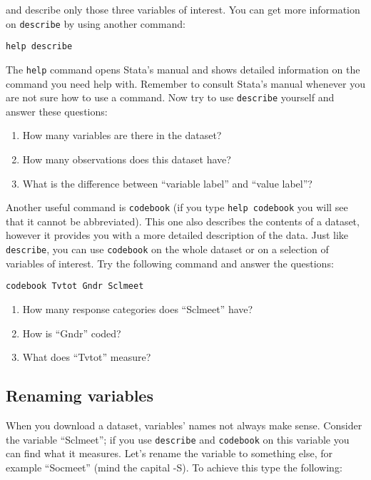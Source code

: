 \documentclass{article}
\begin{document}
and describe only those three variables of interest. You can get more information on \texttt{describe} by using another command:

\begin{lstlisting}
help describe
\end{lstlisting}

The \texttt{help} command opens Stata's manual and shows detailed information on the command you need help with. Remember to consult Stata's manual whenever you are not sure how to use a command. Now try to use \texttt{describe} yourself and answer these questions:

\begin{enumerate}
	\item How many variables are there in the dataset?
	\item How many observations does this dataset have?
	\item What is the difference between ``variable label'' and ``value label''?
\end{enumerate}

Another useful command is \texttt{codebook} (if you type \texttt{help codebook} you will see that it cannot be abbreviated). This one also describes the contents of a dataset, however it provides you with a more detailed description of the data. Just like \texttt{describe}, you can use \texttt{codebook} on the whole dataset or on a selection of variables of interest. Try the following command and answer the questions:

\begin{lstlisting}
codebook Tvtot Gndr Sclmeet
\end{lstlisting}

\begin{enumerate}
	\item How many response categories does ``Sclmeet'' have?
	\item How is ``Gndr'' coded?
	\item What does ``Tvtot'' measure?
\end{enumerate}

\subsection*{Renaming variables}

When you download a dataset, variables' names not always make sense. Consider the variable ``Sclmeet''; if you use \texttt{describe} and \texttt{codebook} on this variable you can find what it measures. Let's rename the variable to something else, for example ``Socmeet'' (mind the capital -S). To achieve this type the following:
\end{document}
